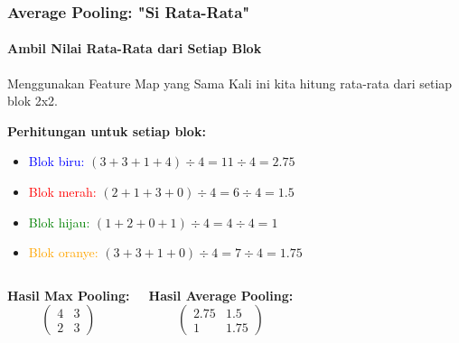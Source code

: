 \documentclass[t,aspectratio=169,xcolor=dvipsnames]{beamer}
\begin{document}
\begin{frame}
    \frametitle{Average Pooling: "Si Rata-Rata"}
    \framesubtitle{Ambil Nilai Rata-Rata dari Setiap Blok}
    \footnotesize

    \begin{block}{Menggunakan Feature Map yang Sama}
        Kali ini kita hitung rata-rata dari setiap blok 2x2.
    \end{block}

    \textbf{Perhitungan untuk setiap blok:}
    \begin{itemize}
        \item \textcolor{blue}{Blok biru:} $(3+3+1+4) \div 4 = 11 \div 4 = 2.75$
        \item \textcolor{red}{Blok merah:} $(2+1+3+0) \div 4 = 6 \div 4 = 1.5$
        \item \textcolor{green}{Blok hijau:} $(1+2+0+1) \div 4 = 4 \div 4 = 1$
        \item \textcolor{orange}{Blok oranye:} $(3+3+1+0) \div 4 = 7 \div 4 = 1.75$
    \end{itemize}

    \begin{columns}[t]
        \textbf{Hasil Max Pooling:}
        $$
        \begin{pmatrix}
        4 & 3 \\
        2 & 3
        \end{pmatrix}
        $$

        \textbf{Hasil Average Pooling:}
        $$
        \begin{pmatrix}
        2.75 & 1.5 \\
        1 & 1.75
        \end{pmatrix}
        $$
    \end{columns}

\end{frame}
\end{document}
